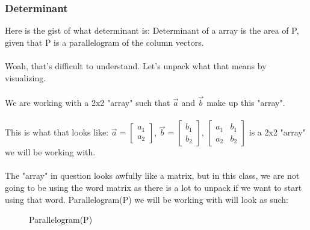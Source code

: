 \documentclass[addpoints]{exam}
\begin{document}
\pagebreak\subsubsection{Determinant}
Here is the gist of what determinant is:
Determinant of a array is the area of P, given that P is a parallelogram of the column vectors. \\\\Woah, that's difficult to understand. Let's unpack what that means by visualizing.\\\\
We are working with a 2x2 "array" such that $\vec{a}$ and $\vec{b}$ make up this "array".\\\\ This is what that looks like: $\vec{a} = \begin{bmatrix} a_1\\a_2\end{bmatrix}$, $\vec{b} = \begin{bmatrix}b_1\\b_2\end{bmatrix}$, $\begin{bmatrix}a_1&b_1\\a_2&b_2\end{bmatrix}$ is a 2x2 "array" we will be working with.\\\\ The "array" in question looks awfully like a matrix, but in this class, we are not going to be using the word matrix as there is a lot to unpack if we want to start using that word. 
Parallelogram(P) we will be working with will look as such: 
\begin{figure}[!h]
    \centering
    \caption{Parallelogram(P)}
    \label{fig:Parallelogram(P)}
\end{figure}\\
\end{document}
